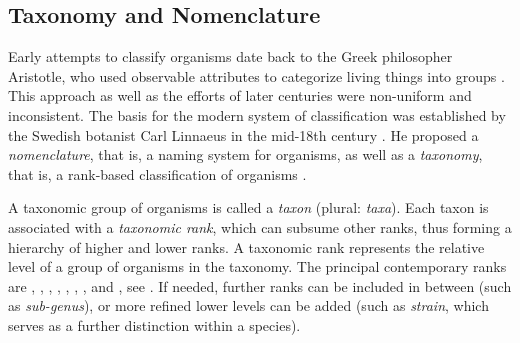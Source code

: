 



\subsection{Taxonomy and Nomenclature}
\label{ch:Foundations:sec:TreeOfLife:sub:TaxonomyNomenclature}

Early attempts to classify organisms date back to the Greek philosopher Aristotle,
who used observable attributes to categorize living things into groups \cite{Leroi2014}.
This approach as well as the efforts of later centuries were non-uniform and inconsistent.
The basis for the modern system of classification was established
by the Swedish botanist Carl Linnaeus in the mid-18th century \cite{Donk1957}.
He proposed a \emph{nomenclature}, that is, a naming system for organisms,
as well as a \emph{taxonomy}, that is, a rank-based classification of organisms \cite{Linnaeus1735,Linnaeus1753}.

A taxonomic group of organisms is called a \emph{taxon} (plural: \emph{taxa}).
Each taxon is associated with a \emph{taxonomic rank}, which can subsume other ranks,
thus forming a hierarchy of higher and lower ranks.
A taxonomic rank represents the relative level of a group of organisms in the taxonomy.
The principal contemporary ranks are , , , ,
, , , and ,
see .
If needed, further ranks can be included in between (such as \emph{sub-genus}),
or more refined lower levels can be added (such as \emph{strain}, which serves as a further distinction within a species).

